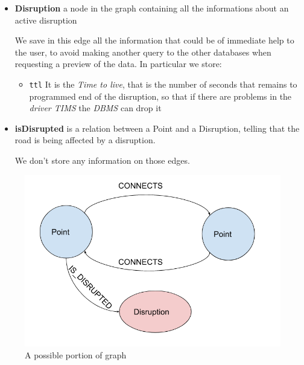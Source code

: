 \begin{itemize}
	\item \textbf{Disruption} a node in the graph containing all the 
	informations about an active disruption
	
	
	
	We save in this edge all the information that could be of immediate help to 
	the user, to avoid making another query to the other databases when 
	requesting a preview of the data. In particular we store:
	
	\begin{itemize}
		\item \texttt{ttl} It is the \textit{Time to live}, that is the number 
		of seconds that remains to programmed end of the disruption, so that if 
		there are problems in the \textit{driver TIMS} the \textit{DBMS} can 
		drop it
	\end{itemize}
	
	\item \textbf{isDisrupted} is a relation between a Point and a Disruption, 
	telling that the road is being affected by a disruption.
	
	We don't store any information on those edges.

\end{itemize}
	
\begin{figure}[H]
	\centering
	\includegraphics[width=0.7\linewidth]{assets/schemaneo4j}
	\caption{A possible portion of graph}
	\label{fig:schemaneo4j}
\end{figure}



